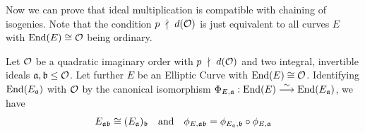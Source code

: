Now we can prove that ideal multiplication is compatible with chaining of isogenies.
Note that the condition $p \ \nmid \  d(\mathcal{O})$ is just equivalent to all curves $E$ with $\mathrm{End}(E) \cong \mathcal{O}$ being ordinary.
\begin{lemma}
    Let $\mathcal{O}$ be a quadratic imaginary order with $p \ \nmid \  d(\mathcal{O})$ and two integral, invertible ideals $\mathfrak{a}, \mathfrak{b} \leq \mathcal{O}$.
    Let further $E$ be an Elliptic Curve with $\mathrm{End}(E) \cong \mathcal{O}$.
    Identifying $\mathrm{End}(E_{\mathfrak{a}})$ with $\mathcal{O}$ by the canonical isomorphism $\Phi_{E, \mathfrak{a}}: \mathrm{End}(E) \overset{\sim}{\longrightarrow} \mathrm{End}(E_{\mathfrak{a}})$, we have
    \begin{equation*}
        E_{\mathfrak{a}\mathfrak{b}} \cong (E_{\mathfrak{a}})_{\mathfrak{b}} \quad \text{and} \quad \phi_{E, \mathfrak{a}\mathfrak{b}} = \phi_{E_{\mathfrak{a}}, \mathfrak{b}} \circ \phi_{E, \mathfrak{a}}
    \end{equation*}
\end{lemma}
